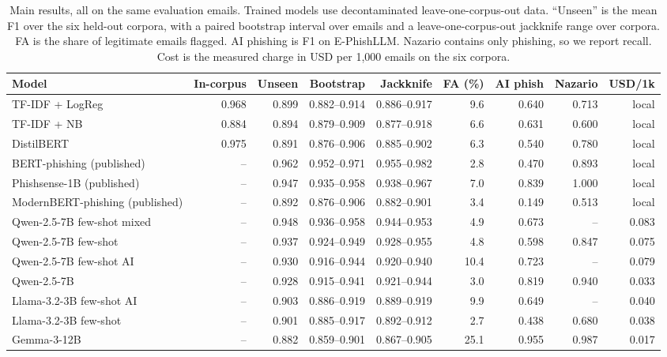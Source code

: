 \begin{table}[t]
\caption{Main results, all on the same evaluation emails. Trained models use decontaminated leave-one-corpus-out data. ``Unseen'' is the mean F1 over the six held-out corpora, with a paired bootstrap interval over emails and a leave-one-corpus-out jackknife range over corpora. FA is the share of legitimate emails flagged. AI phishing is F1 on E-PhishLLM. Nazario contains only phishing, so we report recall. Cost is the measured charge in USD per 1{,}000 emails on the six corpora.}
\label{tab:main}
\centering\footnotesize
\setlength{\tabcolsep}{3.5pt}
\begin{tabular}{lrrrrrrrr}
\toprule
Model & In-corpus & Unseen & Bootstrap & Jackknife & FA (\%) & AI phish & Nazario & USD/1k \\
\midrule
TF-IDF + LogReg & 0.968 & 0.899 & 0.882--0.914 & 0.886--0.917 & 9.6 & 0.640 & 0.713 & local \\
TF-IDF + NB & 0.884 & 0.894 & 0.879--0.909 & 0.877--0.918 & 6.6 & 0.631 & 0.600 & local \\
\midrule
DistilBERT & 0.975 & 0.891 & 0.876--0.906 & 0.885--0.902 & 6.3 & 0.540 & 0.780 & local \\
\midrule
BERT-phishing (published) & -- & 0.962 & 0.952--0.971 & 0.955--0.982 & 2.8 & 0.470 & 0.893 & local \\
Phishsense-1B (published) & -- & 0.947 & 0.935--0.958 & 0.938--0.967 & 7.0 & 0.839 & 1.000 & local \\
ModernBERT-phishing (published) & -- & 0.892 & 0.876--0.906 & 0.882--0.901 & 3.4 & 0.149 & 0.513 & local \\
\midrule
Qwen-2.5-7B few-shot mixed & -- & 0.948 & 0.936--0.958 & 0.944--0.953 & 4.9 & 0.673 & -- & 0.083 \\
Qwen-2.5-7B few-shot & -- & 0.937 & 0.924--0.949 & 0.928--0.955 & 4.8 & 0.598 & 0.847 & 0.075 \\
Qwen-2.5-7B few-shot AI & -- & 0.930 & 0.916--0.944 & 0.920--0.940 & 10.4 & 0.723 & -- & 0.079 \\
Qwen-2.5-7B & -- & 0.928 & 0.915--0.941 & 0.921--0.944 & 3.0 & 0.819 & 0.940 & 0.033 \\
Llama-3.2-3B few-shot AI & -- & 0.903 & 0.886--0.919 & 0.889--0.919 & 9.9 & 0.649 & -- & 0.040 \\
Llama-3.2-3B few-shot & -- & 0.901 & 0.885--0.917 & 0.892--0.912 & 2.7 & 0.438 & 0.680 & 0.038 \\
Gemma-3-12B & -- & 0.882 & 0.859--0.901 & 0.867--0.905 & 25.1 & 0.955 & 0.987 & 0.017 \\

\end{tabular}
\end{table}
